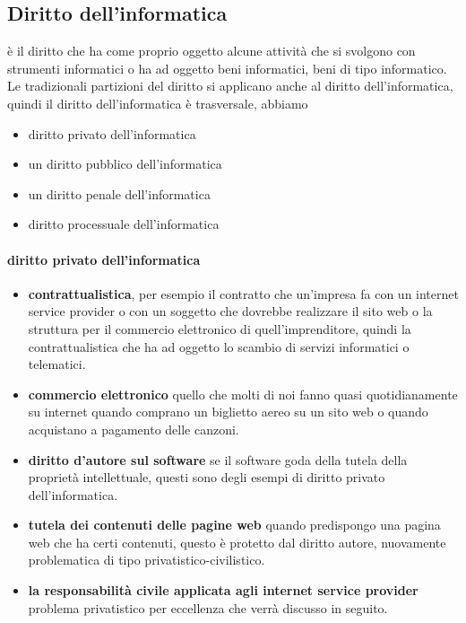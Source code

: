 \subsection{Diritto dell'informatica} è il diritto che ha come proprio oggetto alcune attività che si svolgono con strumenti informatici o ha ad oggetto beni informatici, beni di tipo informatico. Le tradizionali partizioni del diritto si applicano anche al diritto dell'informatica, quindi il diritto dell'informatica è trasversale, abbiamo 
\begin{itemize}
    \item diritto privato dell'informatica
    \item un diritto pubblico dell'informatica 
    \item un diritto penale dell'informatica 
    \item diritto processuale dell'informatica 
\end{itemize}

\paragraph{diritto privato dell'informatica}
\begin{itemize}
    \item \textbf{contrattualistica}, per esempio il contratto che un'impresa fa con un internet service provider o con un soggetto che dovrebbe realizzare il sito web o la struttura per il commercio elettronico di quell'imprenditore, quindi la contrattualistica che ha ad oggetto lo scambio di servizi informatici o telematici.
    \item \textbf{commercio elettronico} quello che molti di noi fanno quasi quotidianamente su internet quando comprano un biglietto aereo su un sito web o quando acquistano a pagamento delle canzoni. 
    \item \textbf{diritto d'autore sul software} se il software goda della tutela della proprietà intellettuale, questi sono degli esempi di diritto privato dell'informatica.  
    \item \textbf{tutela dei contenuti delle pagine web} quando predispongo una pagina web che ha certi contenuti, questo è protetto dal diritto autore, nuovamente problematica di tipo privatistico-civilistico. 
    \item \textbf{la responsabilità civile applicata agli internet service provider} problema privatistico per eccellenza che verrà discusso in seguito.

\end{itemize}


